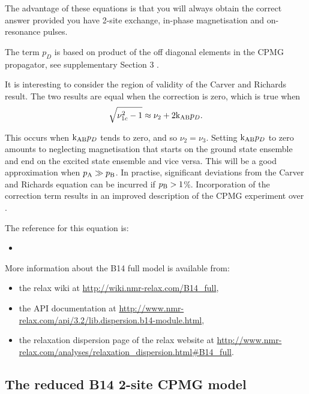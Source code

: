 The advantage of these equations is that you will always obtain the correct answer provided you have 2-site exchange, in-phase magnetisation and on-resonance pulses. 

The term $p_D$ is based on product of the off diagonal elements in the CPMG propagator, see supplementary Section 3 \citep{Baldwin2014}.

It is interesting to consider the region of validity of the Carver and Richards result. The two results are equal when the correction is zero, which is true when
\begin{equation}
    \sqrt{\nu_{1c}^2-1} \approx \nu_2 + 2 \textrm{k}_{\textrm{AB}} p_D .
\end{equation}

This occurs when $\textrm{k}_{\textrm{AB}} p_D$ tends to zero, and so $\nu_2 = \nu_3$.
Setting $\textrm{k}_{\textrm{AB}} p_D$ to zero amounts to neglecting magnetisation that starts on the ground state ensemble and end on the excited state ensemble and vice versa. 
This will be a good approximation when $p_{\textrm{A}} \gg p_{\textrm{B}}$.
In practise, significant deviations from the Carver and Richards equation can be incurred if $p_{\textrm{B}} > 1$\%.
Incorporation of the correction term results in an improved description of the CPMG experiment over \citet{CarverRichards72}.

The reference for this equation is:
\begin{itemize}
  \item {}
\end{itemize}

More information about the B14 full model is available from:
\begin{itemize}
  \item the relax wiki at \url{http://wiki.nmr-relax.com/B14\_full},
  \item the API documentation at \url{http://www.nmr-relax.com/api/3.2/lib.dispersion.b14-module.html},
  \item the relaxation dispersion page of the relax website at \url{http://www.nmr-relax.com/analyses/relaxation\_dispersion.html#B14\_full}.
\end{itemize}



\subsection{The reduced B14 2-site CPMG model}
\label{sect: dispersion: B14 model}

